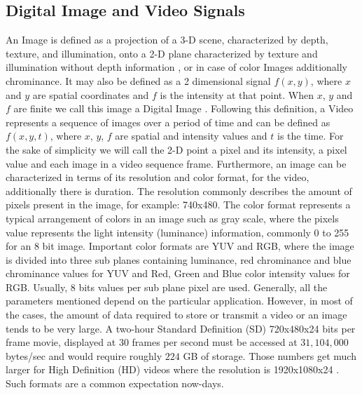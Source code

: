 \documentclass[a4paper,11pt,oneside]{article}
\begin{document}
\subsection{Digital Image and Video Signals}
\indent An Image is defined as a projection of a 3-D scene, characterized by depth, texture, and illumination, onto a 2-D plane characterized by texture and illumination without depth information \cite[pp.~5]{richardson2002video}, or in case of color Images additionally chrominance. It may also be defined as a 2 dimensional signal $ f(x, y) $, where $x$ and $y$ are spatial coordinates and $f$ is the intensity at that point. When $x$, $y$ and $f$ are finite we call this image a Digital Image \cite[ppp.~1]{gonzalez2008digital}. 
Following this definition, a Video represents a sequence of images over a period of time and can be defined as $f(x,y,t)$, where $x$, $y$, $f$ are spatial and intensity values and $t$ is the time.
For the sake of simplicity we will call the 2-D point a pixel and its intensity, a pixel value and each image in a video sequence frame.
Furthermore, an image can be characterized in terms of its resolution and color format, for the video, additionally there is duration. The resolution commonly describes the amount of pixels present in the image, for example: 740x480. The color format represents a typical arrangement of colors in an image such as gray scale, where the pixels value represents the light intensity (luminance) information, commonly 0 to 255 for an 8 bit image. Important color formats are YUV and RGB, where the image is divided into three sub planes containing luminance, red chrominance and blue chrominance values for YUV and Red, Green and Blue color intensity values for RGB. Usually, 8 bits values per sub plane pixel are used. Generally, all the parameters mentioned depend on the particular application. However, in most of the cases, the amount of data required to store or transmit a video or an image tends to be very large. A two-hour Standard Definition (SD) 720x480x24 bits per frame movie, displayed at 30 frames per second must be accessed at $ 31,104,000 $ bytes/sec and would require roughly $224$ GB of storage. Those numbers get much larger for High Definition (HD) videos where the resolution is 1920x1080x24 \cite[pp.~525-526]{gonzalez2008digital}. Such formats are a common expectation now-days. \\
\end{document}
